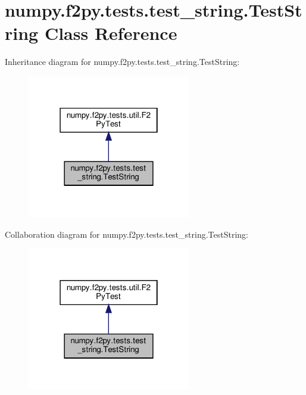\hypertarget{classnumpy_1_1f2py_1_1tests_1_1test__string_1_1TestString}{}\section{numpy.\+f2py.\+tests.\+test\+\_\+string.\+Test\+String Class Reference}
\label{classnumpy_1_1f2py_1_1tests_1_1test__string_1_1TestString}


Inheritance diagram for numpy.\+f2py.\+tests.\+test\+\_\+string.\+Test\+String\+:
\nopagebreak
\begin{figure}[H]
\begin{center}
\leavevmode
\includegraphics[width=202pt]{classnumpy_1_1f2py_1_1tests_1_1test__string_1_1TestString__inherit__graph}
\end{center}
\end{figure}


Collaboration diagram for numpy.\+f2py.\+tests.\+test\+\_\+string.\+Test\+String\+:
\nopagebreak
\begin{figure}[H]
\begin{center}
\leavevmode
\includegraphics[width=202pt]{classnumpy_1_1f2py_1_1tests_1_1test__string_1_1TestString__coll__graph}
\end{center}
\end{figure}
